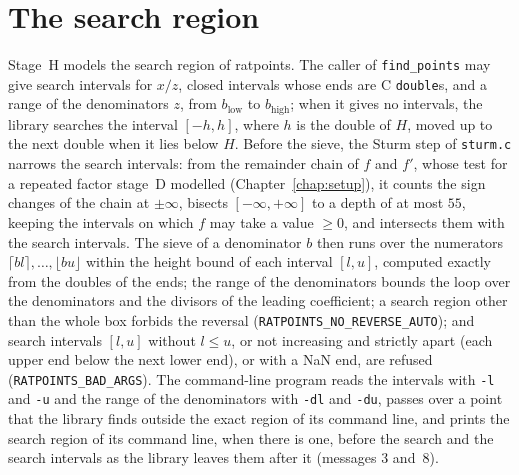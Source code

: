 \chapter{The search region}\label{chap:region}

Stage~H models the search region of ratpoints. The caller of \verb|find_points| may give search
intervals for $x/z$, closed intervals whose ends are C \verb|double|s, and a range of the
denominators $z$, from $b_{\mathrm{low}}$ to $b_{\mathrm{high}}$; when it gives no intervals, the
library searches the interval $[-h, h]$, where $h$ is the double of $H$, moved up to the next double
when it lies below $H$. Before the sieve, the Sturm step of \verb|sturm.c| narrows the search
intervals: from the remainder chain of $f$ and $f'$, whose test for a repeated factor stage~D
modelled (Chapter~\ref{chap:setup}), it counts the sign changes of the chain at $\pm\infty$, bisects
$[-\infty, +\infty]$ to a depth of at most $55$, keeping the intervals on which $f$ may take a value
$\ge 0$, and intersects them with the search intervals. The sieve of a denominator $b$ then runs
over the numerators $\lceil b l \rceil, \dots, \lfloor b u \rfloor$ within the height bound of each
interval $[l, u]$, computed exactly from the doubles of the ends; the range of the denominators
bounds the loop over the denominators and the divisors of the leading coefficient; a search region
other than the whole box forbids the reversal (\verb|RATPOINTS_NO_REVERSE_AUTO|); and search
intervals $[l, u]$ without $l \le u$, or not increasing and strictly apart (each upper end below the
next lower end), or with a NaN end, are refused (\verb|RATPOINTS_BAD_ARGS|). The command-line
program reads the intervals with \verb|-l| and \verb|-u| and the range of the denominators with
\verb|-dl| and \verb|-du|, passes over a point that the library finds outside the exact region of
its command line, and prints the search region of its command line, when there is one, before the
search and the search intervals as the library leaves them after it (messages 3 and~8).

